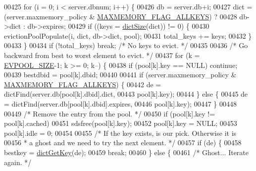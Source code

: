 \begin{DoxyCode}
00425                 \textcolor{keywordflow}{for} (i = 0; i < server.dbnum; i++) \{
00426                     db = server.db+i;
00427                     dict = (server.maxmemory\_policy & 
      \hyperlink{server_8h_a6fccff10a0d37e23fb8114d5c87737d0}{MAXMEMORY\_FLAG\_ALLKEYS}) ?
00428                             db->dict : db->expires;
00429                     \textcolor{keywordflow}{if} ((keys = \hyperlink{dict_8h_af193430dd3d5579a52b194512f72c1f0}{dictSize}(dict)) != 0) \{
00430                         evictionPoolPopulate(i, dict, db->dict, pool);
00431                         total\_keys += keys;
00432                     \}
00433                 \}
00434                 \textcolor{keywordflow}{if} (!total\_keys) \textcolor{keywordflow}{break}; \textcolor{comment}{/* No keys to evict. */}
00435 
00436                 \textcolor{comment}{/* Go backward from best to worst element to evict. */}
00437                 \textcolor{keywordflow}{for} (k = \hyperlink{evict_8c_a459751f47982906b9beb736ea3519e97}{EVPOOL\_SIZE}-1; k >= 0; k--) \{
00438                     \textcolor{keywordflow}{if} (pool[k].key == NULL) \textcolor{keywordflow}{continue};
00439                     bestdbid = pool[k].dbid;
00440 
00441                     \textcolor{keywordflow}{if} (server.maxmemory\_policy & \hyperlink{server_8h_a6fccff10a0d37e23fb8114d5c87737d0}{MAXMEMORY\_FLAG\_ALLKEYS}) \{
00442                         de = dictFind(server.db[pool[k].dbid].dict,
00443                             pool[k].key);
00444                     \} \textcolor{keywordflow}{else} \{
00445                         de = dictFind(server.db[pool[k].dbid].expires,
00446                             pool[k].key);
00447                     \}
00448 
00449                     \textcolor{comment}{/* Remove the entry from the pool. */}
00450                     \textcolor{keywordflow}{if} (pool[k].key != pool[k].cached)
00451                         sdsfree(pool[k].key);
00452                     pool[k].key = NULL;
00453                     pool[k].idle = 0;
00454 
00455                     \textcolor{comment}{/* If the key exists, is our pick. Otherwise it is}
00456 \textcolor{comment}{                     * a ghost and we need to try the next element. */}
00457                     \textcolor{keywordflow}{if} (de) \{
00458                         bestkey = \hyperlink{dict_8h_a3271c334309904a3086deca94f96e46e}{dictGetKey}(de);
00459                         \textcolor{keywordflow}{break};
00460                     \} \textcolor{keywordflow}{else} \{
00461                         \textcolor{comment}{/* Ghost... Iterate again. */}

\end{DoxyCode}
